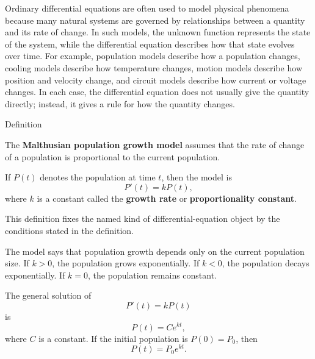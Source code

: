 \begin{exposition}
Ordinary differential equations are often used to model physical phenomena because many natural systems are governed by relationships between a quantity and its rate of change. In such models, the unknown function represents the state of the system, while the differential equation describes how that state evolves over time. For example, population models describe how a population changes, cooling models describe how temperature changes, motion models describe how position and velocity change, and circuit models describe how current or voltage changes. In each case, the differential equation does not usually give the quantity directly; instead, it gives a rule for how the quantity changes.
\end{exposition}


\begin{definitionbox}{Definition}
\begin{definition}
\label{def:ordinary-differential-equations-models-malthusian-population-growth-model}
The \textbf{Malthusian population growth model} assumes that the rate of change of a population is proportional to the current population.

If $P(t)$ denotes the population at time $t$, then the model is
\[
P'(t)=kP(t),
\]
where $k$ is a constant called the \textbf{growth rate} or \textbf{proportionality constant}.
\end{definition}
\end{definitionbox}

\begin{remark*}
This definition fixes the named kind of differential-equation object by the
conditions stated in the definition.
\end{remark*}

\begin{remark*}[Interpretation]
The model says that population growth depends only on the current population size. If $k>0$, the population grows exponentially. If $k<0$, the population decays exponentially. If $k=0$, the population remains constant.
\end{remark*}

\begin{remark*}[Examples]
The general solution of
\[
P'(t)=kP(t)
\]
is
\[
P(t)=Ce^{kt},
\]
where $C$ is a constant. If the initial population is $P(0)=P_0$, then
\[
P(t)=P_0e^{kt}.
\]
\end{remark*}

